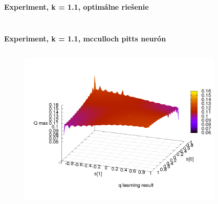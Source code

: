 \documentclass[xcolor=dvipsnames]{beamer}
\begin{document}
\begin{frame}{\bf Experiment, k = 1.1, optimálne riešenie}
\begin{columns}
\begin{column}{0.5\textwidth}
\begin{figure}[ht]
        \end{figure}

	\end{column}
\end{columns}

\end{frame}


\begin{frame}{\bf Experiment, k = 1.1, mcculloch pitts neurón}

\begin{columns}
	\begin{column}{0.5\textwidth}

        \begin{figure}[ht]

        \begin{center}
        \includegraphics[width=1.0\textwidth]{experiment_01/mcculloch_pitts_neuron/q_map.png}
        \end{center}

        \end{figure}

	\end{column}
	\begin{column}{0.5\textwidth}

        \begin{figure}[ht]


\end{figure}
\end{column}
\end{columns}
\end{frame}
\end{document}
